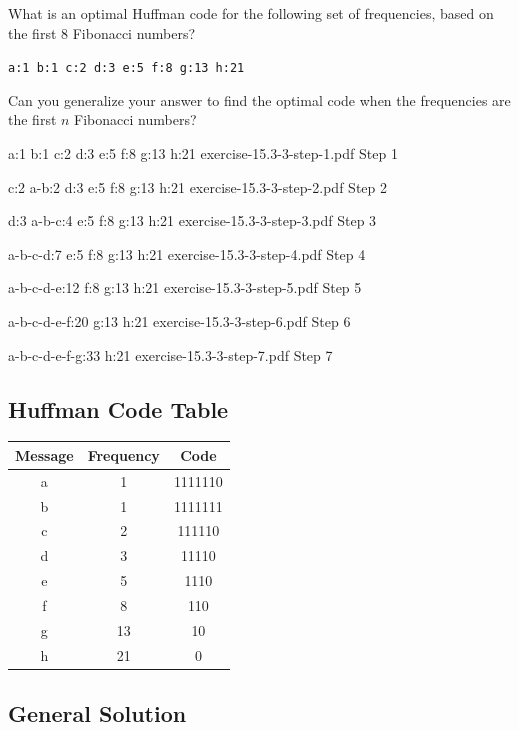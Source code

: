 \item[\textbf{Exercise 15.3-3}]
What is an optimal Huffman code for the following set of frequencies, based on
the first 8 Fibonacci numbers?

\texttt{a:1 b:1 c:2 d:3 e:5 f:8 g:13 h:21}

Can you generalize your answer to find the optimal code when the frequencies are
the first $n$ Fibonacci numbers?

\Solution

\HuffmanStep
    {a:1 b:1 c:2 d:3 e:5 f:8 g:13 h:21}
    {exercise-15.3-3-step-1.pdf}
    {Step 1}

\HuffmanStep
    {c:2 a-b:2 d:3 e:5 f:8 g:13 h:21}
    {exercise-15.3-3-step-2.pdf}
    {Step 2}

\HuffmanStep
    {d:3 a-b-c:4 e:5 f:8 g:13 h:21}
    {exercise-15.3-3-step-3.pdf}
    {Step 3}

\HuffmanStep
    {a-b-c-d:7 e:5 f:8 g:13 h:21}
    {exercise-15.3-3-step-4.pdf}
    {Step 4}

\HuffmanStep
    {a-b-c-d-e:12 f:8 g:13 h:21}
    {exercise-15.3-3-step-5.pdf}
    {Step 5}

\HuffmanStep
    {a-b-c-d-e-f:20 g:13 h:21}
    {exercise-15.3-3-step-6.pdf}
    {Step 6}

\HuffmanStep
    {a-b-c-d-e-f-g:33 h:21}
    {exercise-15.3-3-step-7.pdf}
    {Step 7}


\subsection*{Huffman Code Table}

\begin{tabularx}{\linewidth}{ C | C | C }
Message & Frequency & Code \\
\hline
a & 1 & 1111110 \\
\hline
b & 1 & 1111111 \\
\hline
c & 2 & 111110 \\
\hline
d & 3 & 11110 \\
\hline
e & 5 & 1110 \\
\hline
f & 8 & 110 \\
\hline
g & 13 & 10 \\
\hline
h & 21 & 0 \\
\end{tabularx}

\subsection*{General Solution}

